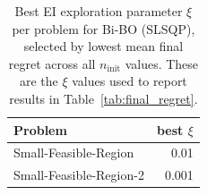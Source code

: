 \documentclass[12pt,a4paper]{article}%
\theoremstyle{plain}%
\theoremstyle{remark}%
\theoremstyle{definition}%
\providecommand{\DIFaddbegin}{} %
\providecommand{\DIFdelbegin}{} %
\providecommand{\DIFdelend}{} %
\newcommand{\DIFscaledelfig}{0.5}
\newlength{\DIFdelgraphicswidth} %
\newlength{\DIFdelgraphicsheight} %
\newcommand{\DIFaddincludegraphics}[2][]{{\color{blue}\fbox{\DIFOincludegraphics[#1]{#2}}}} %
\newcommand{\DIFdelincludegraphics}[2][]{%
\sbox{\DIFdelgraphicsbox}{\DIFOincludegraphics[#1]{#2}}%
\settoboxwidth{\DIFdelgraphicswidth}{\DIFdelgraphicsbox} %
\settoboxtotalheight{\DIFdelgraphicsheight}{\DIFdelgraphicsbox} %
\scalebox{\DIFscaledelfig}{%
\parbox[b]{\DIFdelgraphicswidth}{\usebox{\DIFdelgraphicsbox}\\[-\baselineskip] \rule{\DIFdelgraphicswidth}{0em}}\llap{\resizebox{\DIFdelgraphicswidth}{\DIFdelgraphicsheight}{%
\setlength{\unitlength}{\DIFdelgraphicswidth}%
\begin{picture}(1,1)%
\thicklines\linethickness{2pt} %
{\color[rgb]{1,0,0}\put(0,0){\framebox(1,1){}}}%
{\color[rgb]{1,0,0}\put(0,0){\line( 1,1){1}}}%
{\color[rgb]{1,0,0}\put(0,1){\line(1,-1){1}}}%
\end{picture}%
}\hspace*{3pt}}} %
} %
\DeclareRobustCommand{\DIFaddbegin}{\DIFOaddbegin \let\includegraphics\DIFaddincludegraphics} %
\DeclareRobustCommand{\DIFdelbegin}{\DIFOdelbegin \let\includegraphics\DIFdelincludegraphics} %
\DeclareRobustCommand{\DIFdelend}{\DIFOaddend \let\includegraphics\DIFOincludegraphics} %
\begin{document}
\begin{appendices}
\DIFdelbegin %
\DIFdelend \DIFaddbegin \begin{table}[htbp]
\centering
\caption{Best EI exploration parameter $\xi$ per problem for Bi-BO (SLSQP), selected by lowest mean final regret across all $n_\text{init}$ values. These are the $\xi$ values used to report results in Table~\ref{tab:final_regret}.}
\label{tab:best_xi}
\begin{tabular}{@{}lr@{}}
\toprule
\textbf{Problem} & \textbf{best $\xi$} \\
\midrule
Small-Feasible-Region   & 0.01  \\
Small-Feasible-Region-2 & 0.001 \\

\end{tabular}
\end{table}
\end{appendices}
\end{document}
